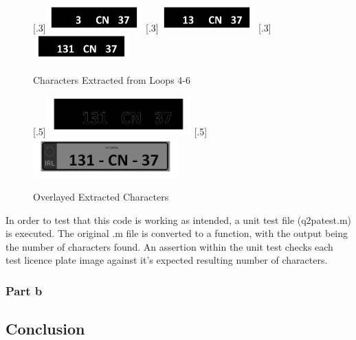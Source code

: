 \documentclass[a4paper]{article}
\begin{document}
	\begin{figure}[H]
		\centering
		[.3\linewidth]{\includegraphics[height=1cm]{Results/Q2/NumPlate1/qanumber_plate_1Added4.jpg}}%
		[.3\linewidth]{\includegraphics[height=1cm]{Results/Q2/NumPlate1/qanumber_plate_1Added5.jpg}}%
		[.3\linewidth]{\includegraphics[height=1cm]{Results/Q2/NumPlate1/qanumber_plate_1Added6.jpg}}%
		\caption{Characters Extracted from Loops 4-6}
		\label{fig:}
	\end{figure}
	\begin{figure}[H]
		\centering
		[.5\linewidth]{\includegraphics[height=1.5cm]{Results/Q2/NumPlate1/qanumber_plate_1Canny.jpg}}%
		[.5\linewidth]{\includegraphics[height=1.5cm]{Results/Q2/NumPlate1/qanumber_plate_1Overlay.jpg}}%
		\caption{Overlayed Extracted Characters}
		\label{fig:}
	\end{figure}
	\par In order to test that this code is working as intended, a unit test file
	(q2patest.m) is executed. The original .m file is converted to a
	function, with the output being the number of characters found. An
	assertion within the unit test checks each test licence plate image
	against it's expected resulting number of characters.
	\subsubsection{Part b}
	\subsection{Conclusion}
\end{document}

